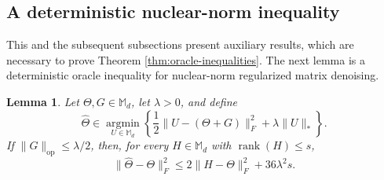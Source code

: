 \documentclass[11pt]{article}
\newtheorem{lemma}[theorem]{Lemma}
\begin{document}
\subsection{A deterministic nuclear-norm inequality}
\label{subsec:deterministic-nuclear-inequality}

This and the subsequent subsections present auxiliary results, which are necessary to prove Theorem \ref{thm:oracle-inequalities}.
The next lemma is a deterministic oracle inequality for nuclear-norm regularized
matrix denoising. %

\begin{lemma}%
\label{lem:nuclear-denoising}
Let $\Theta,G\in\mathbb M_d$, let $\lambda>0$, and define
\[
    \widehat\Theta
    \in\underset{U\in\mathbb M_d}{\operatorname{argmin}}
    \left\{
        \frac12\|U-(\Theta+G)\|_F^2+\lambda\|U\|_*
    \right\}.
\]
If $\|G\|_{\mathrm{op}}\leq\lambda/2$, then, for every
$H\in\mathbb M_d$ with $\operatorname{rank}(H)\leq s$,
\begin{equation}
    \|\widehat\Theta-\Theta\|_F^2
    \leq
    2\|H-\Theta\|_F^2+36\lambda^2s.
\label{eq:nuclear-denoising-oracle}
\end{equation}
\end{lemma}
\end{document}
